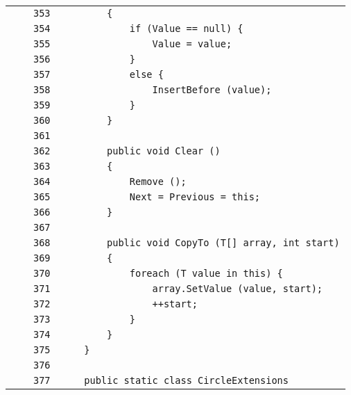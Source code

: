 \documentclass[a4paper,10pt]{article}
\begin{document}
\begin{longtable}[l]{lrrl}
\cellcolor{gray} &  & \verb~353~ & \verb~        {~\\
\cellcolor{gray} &  & \verb~354~ & \verb~            if (Value == null) {~\\
\cellcolor{gray} &  & \verb~355~ & \verb~                Value = value;~\\
\cellcolor{gray} &  & \verb~356~ & \verb~            }~\\
\cellcolor{gray} &  & \verb~357~ & \verb~            else {~\\
\cellcolor{gray} &  & \verb~358~ & \verb~                InsertBefore (value);~\\
\cellcolor{gray} &  & \verb~359~ & \verb~            }~\\
\cellcolor{gray} &  & \verb~360~ & \verb~        }~\\
\cellcolor{gray} &  & \verb~361~ & \verb~~\\
\cellcolor{gray} &  & \verb~362~ & \verb~        public void Clear ()~\\
\cellcolor{gray} &  & \verb~363~ & \verb~        {~\\
\cellcolor{gray} &  & \verb~364~ & \verb~            Remove ();~\\
\cellcolor{gray} &  & \verb~365~ & \verb~            Next = Previous = this;~\\
\cellcolor{gray} &  & \verb~366~ & \verb~        }~\\
\cellcolor{gray} &  & \verb~367~ & \verb~~\\
\cellcolor{gray} &  & \verb~368~ & \verb~        public void CopyTo (T[] array, int start)~\\
\cellcolor{gray} &  & \verb~369~ & \verb~        {~\\
\cellcolor{gray} &  & \verb~370~ & \verb~            foreach (T value in this) {~\\
\cellcolor{gray} &  & \verb~371~ & \verb~                array.SetValue (value, start);~\\
\cellcolor{gray} &  & \verb~372~ & \verb~                ++start;~\\
\cellcolor{gray} &  & \verb~373~ & \verb~            }~\\
\cellcolor{gray} &  & \verb~374~ & \verb~        }~\\
\cellcolor{gray} &  & \verb~375~ & \verb~    }~\\
\cellcolor{gray} &  & \verb~376~ & \verb~~\\
\cellcolor{gray} &  & \verb~377~ & \verb~    public static class CircleExtensions~\\

\end{longtable}
\end{document}
